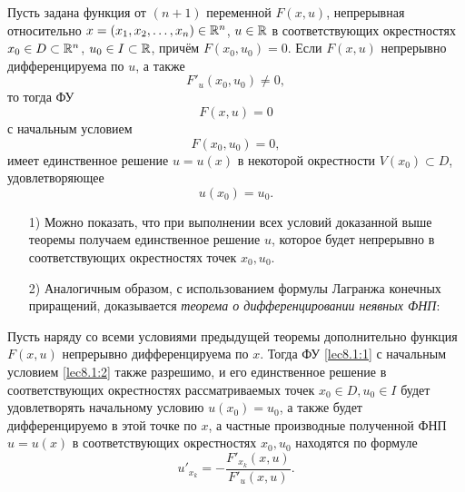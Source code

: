 \documentclass[../main.tex]{subfiles}
\begin{document}
\begin{thm}
		Пусть задана функция от $(n+1)$ переменной $F(x, u)$, непрерывная 
		относительно $x = (x_1, x_2, \ldots,
	 	x_n) \in \mathbb{R}^n$, $u \in \mathbb{R}$ в соответствующих окрестностях $x_0 \in D 
	 	\subset \mathbb{R}^n$, $u_0 \in I \subset \mathbb{R}$, причём $F(x_0,u_0)=0$. Если $F(x,u)$ 
	 	непрерывно дифференцируема по $u$, а также 
		\begin{equation}
			F'_u(x_0, u_0) \ne 0, \label{lec8.1:4}
		\end{equation}
		то тогда ФУ \begin{equation}
		F(x,u) = 0 \label{lec8.1:1}
	 \end{equation} с начальным условием \begin{equation}
		F(x_0, u_0) = 0, \label{lec8.1:2}
	 \end{equation} имеет 
		единственное решение $u = u(x)$ в некоторой окрестности $V(x_0) 
		\subset D$, удовлетворяющее
	 	\begin{equation}
			u(x_0) = u_0. \label{lec8.1:5}
		\end{equation}
	 \end{thm}
\begin{rems}
	 \;
		 \begin{itemize}
		 	 \item[1)] Можно показать, что при выполнении всех условий 
		 	 доказанной выше теоремы получаем единственное решение $u$, 
		 	 которое будет непрерывно в соответствующих окрестностях точек 
		 	 $x_0, u_0$.

			 \item[2)] Аналогичным образом, с использованием формулы Лагранжа 
			 конечных приращений, доказывается \emph{теорема о 
			 дифференцировании неявных ФНП}:
		\end{itemize}
	\end{rems}
\begin{thm}
		Пусть наряду со всеми условиями предыдущей теоремы дополнительно 
		функция $F(x, u)$ непрерывно дифференцируема по $x$. Тогда ФУ 
		\eqref{lec8.1:1} с начальным условием \eqref{lec8.1:2} также разрешимо, 
		и его единственное решение в соответствующих окрестностях 
		рассматриваемых точек $x_0 \in D, u_0 \in I$ будет удовлетворять 
		начальному условию $u(x_0)=u_0$, а также будет дифференцируемо в 
		этой точке по $x$, а частные производные полученной ФНП $u = u(x)$ в 
		соответствующих окрестностях $x_0, u_0$ находятся по формуле
		\begin{equation}
			u'_{x_k} = -\frac{F'_{x_k}(x,u)}{F'_u(x,u)}. \label{lec8.1:6}
		\end{equation}
    \end{thm}
\end{document}
